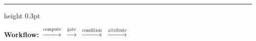 \documentclass{article}
\begin{document}
\begin{center}
{\begin{minipage}{0.97\textwidth}
\vspace{0.15cm}
\hrule height 0.3pt
\vspace{0.08cm}

\begin{center}
\small
\textbf{Workflow:}  $\xrightarrow{\text{compute}}$  $\xrightarrow{\text{gate}}$  $\xrightarrow{\text{condition}}$  $\xrightarrow{\text{attribute}}$ 
\end{center}

\vspace{0.1cm}
\end{minipage}
}
\end{center}
\end{document}

